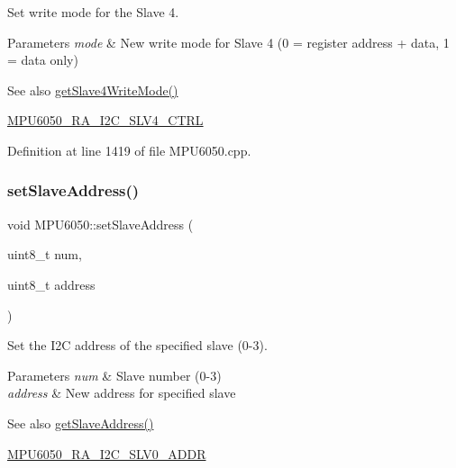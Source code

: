 Set write mode for the Slave 4. 
\begin{DoxyParams}{Parameters}
{\em mode} & New write mode for Slave 4 (0 = register address + data, 1 = data only) \\
\hline
\end{DoxyParams}
\begin{DoxySeeAlso}{See also}
\mbox{\hyperlink{classMPU6050_a8d5a5e73907c78960154b92656127372}{get\+Slave4\+Write\+Mode()}} 

\mbox{\hyperlink{MPU6050_8h_a2b6fbfceb145ba1c8b19f51475fd7a5d}{M\+P\+U6050\+\_\+\+R\+A\+\_\+\+I2\+C\+\_\+\+S\+L\+V4\+\_\+\+C\+T\+RL}} 
\end{DoxySeeAlso}


Definition at line 1419 of file M\+P\+U6050.\+cpp.


\begin{DoxyCode}{0}

\end{DoxyCode}
\mbox{\label{classMPU6050_a3c07eb2c59fff3ddc7186319ee40ba6f}} 
\subsubsection{\texorpdfstring{setSlaveAddress()}{setSlaveAddress()}}
{\footnotesize\ttfamily void M\+P\+U6050\+::set\+Slave\+Address (\begin{DoxyParamCaption}\item[{uint8\+\_\+t}]{num,  }\item[{uint8\+\_\+t}]{address }\end{DoxyParamCaption})}

Set the I2C address of the specified slave (0-\/3). 
\begin{DoxyParams}{Parameters}
{\em num} & Slave number (0-\/3) \\
\hline
{\em address} & New address for specified slave \\
\hline
\end{DoxyParams}
\begin{DoxySeeAlso}{See also}
\mbox{\hyperlink{classMPU6050_af75b9f7ccac48515c7544238db0e6863}{get\+Slave\+Address()}} 

\mbox{\hyperlink{MPU6050_8h_a423463fce914683217f05e3ca686364c}{M\+P\+U6050\+\_\+\+R\+A\+\_\+\+I2\+C\+\_\+\+S\+L\+V0\+\_\+\+A\+D\+DR}} 
\end{DoxySeeAlso}


